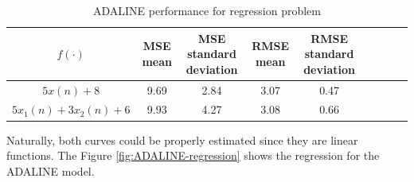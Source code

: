 \documentclass[12pt,a4paper]{article}
\begin{document}
\begin{table}[H]
	\centering
	\caption{ADALINE performance for regression problem}
	\footnotesize
	\setlength{\tabcolsep}{5pt}
	\begin{tabular}{ccccccccc}
		\hline
		\(f(\cdot)\) & MSE mean & MSE standard deviation & RMSE mean & RMSE standard deviation \\
		\hline
		\(5x(n)+8\) & 9.69 & 2.84 & 3.07 & 0.47 \\
        \hline
		\(5x_1(n)+3x_2(n)+6\) & 9.93 & 4.27 & 3.08 & 0.66 \\
		\hline
	\end{tabular} \label{tab:adaline-results}
\end{table}

Naturally, both curves could be properly estimated since they are linear functions. The Figure \ref{fig:ADALINE-regression} shows the regression for the ADALINE model.
\end{document}
